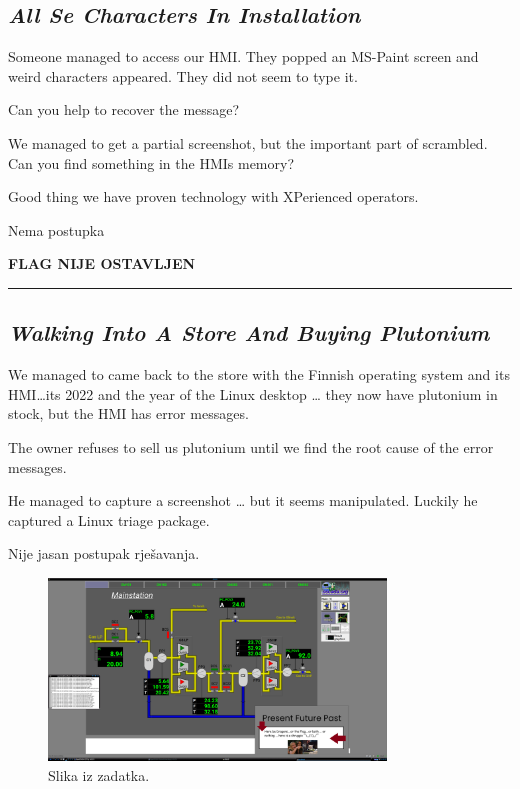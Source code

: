 \documentclass{article}
\begin{document}
\subsection{\textit{All Se Characters In Installation}}
\begin{tcolorbox}[
    colback=gray!5,  %
    colframe=gray!75,  %
    title=\textbf{Zadatak}]
    Someone managed to access our HMI. They popped an MS-Paint screen and weird characters appeared. They did not seem to type it.

Can you help to recover the message?

We managed to get a partial screenshot, but the important part of scrambled. Can you find something in the HMIs memory?

Good thing we have proven technology with XPerienced operators.
\end{tcolorbox}

Nema postupka

\begin{center}
    \textbf{FLAG NIJE OSTAVLJEN}    
\end{center}

\noindent\rule{\textwidth}{0.4pt}

\subsection{\textit{Walking Into A Store And Buying Plutonium}}
\begin{tcolorbox}[
    colback=gray!5,  %
    colframe=gray!75,  %
    title=\textbf{Zadatak}]
    We managed to came back to the store with the Finnish operating system and its HMI…its 2022 and the year of the Linux desktop … they now have plutonium in stock, but the HMI has error messages.

    The owner refuses to sell us plutonium until we find the root cause of the error messages.
    
    He managed to capture a screenshot … but it seems manipulated. Luckily he captured a Linux triage package.
\end{tcolorbox}

Nije jasan postupak rješavanja.
\begin{figure}[h]
    \centering
    \includegraphics[width=0.8\textwidth]{Walking_Into_a_Store_and_Buying_Plutonium.png}
    \caption{Slika iz zadatka.}
    \label{fig:primjer}
\end{figure}
\end{document}
